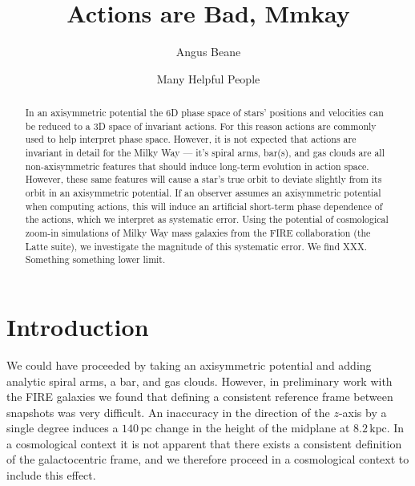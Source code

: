\documentclass[twocolumn]{aastex62}
\newcommand{\pc}{\text{pc}}
\newcommand{\kpc}{\text{kpc}}
\begin{document}
\title{Actions are Bad, Mmkay}


\author{Angus Beane}

\author{Many Helpful People}
\noaffiliation

\begin{abstract}

In an axisymmetric potential the 6D phase space of stars' positions and velocities can be reduced to a 3D space of invariant actions. For this reason actions are commonly used to help interpret phase space. However, it is not expected that actions are invariant in detail for the Milky Way --- it's spiral arms, bar(s), and gas clouds are all non-axisymmetric features that should induce long-term evolution in action space. However, these same features will cause a star's true orbit to deviate slightly from its orbit in an axisymmetric potential. If an observer assumes an axisymmetric potential when computing actions, this will induce an artificial short-term phase dependence of the actions, which we interpret as systematic error. Using the potential of cosmological zoom-in simulations of Milky Way mass galaxies from the FIRE collaboration (the Latte suite), we investigate the magnitude of this systematic error. We find XXX. Something something lower limit.

\end{abstract}


\section{Introduction} \label{sec:intro}


We could have proceeded by taking an axisymmetric potential and adding analytic spiral arms, a bar, and gas clouds. However, in preliminary work with the FIRE galaxies we found that defining a consistent reference frame between snapshots was very difficult. An inaccuracy in the direction of the $z$-axis by a single degree induces a $140\,\pc$ change in the height of the midplane at $8.2\,\kpc$. In a cosmological context it is not apparent that there exists a consistent definition of the galactocentric frame, and we therefore proceed in a cosmological context to include this effect.
\end{document}
